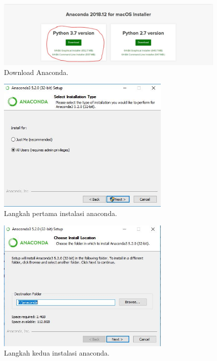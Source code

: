 \begin{figure}[ht]\centerline{\includegraphics[width=1\textwidth]{figures/huda/1.JPG}}\caption{Download Anaconda.}\end{figure}
\begin{figure}[ht]\centerline{\includegraphics[width=0.75\textwidth]{figures/huda/2.JPG}}\caption{Langkah pertama instalasi anaconda.}\end{figure}
\begin{figure}[ht]\centerline{\includegraphics[width=0.75\textwidth]{figures/huda/3.JPG}}\caption{Langkah kedua instalasi anaconda.}\end{figure}
